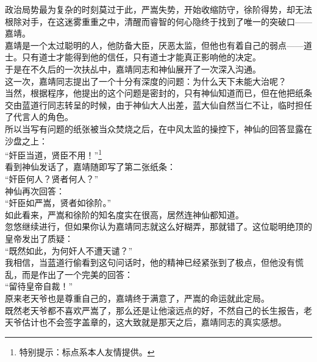 \begin{multicols}{\theparacolNo}
政治局势最为复杂的时刻莫过于此，严嵩失势，开始收缩防守，徐阶得势，却无法根除对手，在这迷雾重重之中，清醒而睿智的何心隐终于找到了唯一的突破口——嘉靖。\\

嘉靖是一个太过聪明的人，他防备大臣，厌恶太监，但他也有着自己的弱点——道士。只有道士才能得到他的信任，只有道士才能真正影响他的决定。\\

于是在不久后的一次扶乩中，嘉靖同志和神仙展开了一次深入沟通。\\

这一次，嘉靖同志提出了一个十分有深度的问题：为什么天下未能大治呢？\\

当然，根据程序，他提出的这个问题是密封的，只有神仙知道而已，但在他把纸条交由蓝道行同志转呈的时候，由于神仙大人出差，蓝大仙自然当仁不让，临时担任了代言人的角色。\\

所以当写有问题的纸张被当众焚烧之后，在中风太监的操控下，神仙的回答显露在沙盘之上：\\

“奸臣当道，贤臣不用！”\footnote{特别提示：标点系本人友情提供。}\\

看到神仙发话了，嘉靖随即写了第二张纸条：\\

“奸臣何人？贤者何人？”\\

神仙再次回答：\\

“奸臣如严嵩，贤者如徐阶。”\\

如此看来，严嵩和徐阶的知名度实在很高，居然连神仙都知道。\\

忽悠继续进行，但如果你认为嘉靖同志就这么好糊弄，那就错了。这位聪明绝顶的皇帝发出了质疑：\\

“既然如此，为何奸人不遭天谴？”\\

我相信，当蓝道行偷看到这句问话时，他的精神已经紧张到了极点，但他没有慌乱，而是作出了一个完美的回答：\\

“留待皇帝自裁！”\\

原来老天爷也是尊重自己的，嘉靖终于满意了，严嵩的命运就此定局。\\

既然老天爷都不喜欢严嵩了，那么还是让他滚远点的好，不然自己的长生报告，老天爷估计也不会签字盖章的，这大致就是那天之后，嘉靖同志的真实感想。\\


\end{multicols}
